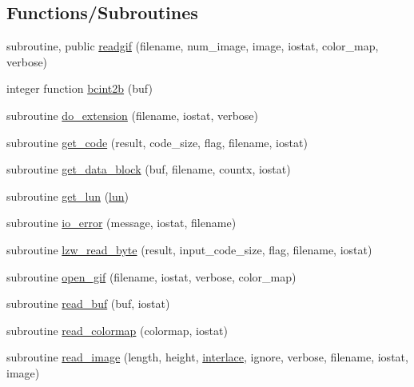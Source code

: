 \subsection*{Functions/\+Subroutines}
\begin{DoxyCompactItemize}
\item 
subroutine, public \mbox{\hyperlink{namespacem__readgif_a775e2da2a9f54ec308e87a339a393ed6}{readgif}} (filename, num\+\_\+image, image, iostat, color\+\_\+map, verbose)
\item 
integer function \mbox{\hyperlink{namespacem__readgif_a38594ce718f97f844771250edcd5e496}{bcint2b}} (buf)
\item 
subroutine \mbox{\hyperlink{namespacem__readgif_a93c5f69ee5054ba2c10ed17b8ab53f6b}{do\+\_\+extension}} (filename, iostat, verbose)
\item 
subroutine \mbox{\hyperlink{namespacem__readgif_a027fedbf7ba68763483988c1aa6d2cea}{get\+\_\+code}} (result, code\+\_\+size, flag, filename, iostat)
\item 
subroutine \mbox{\hyperlink{namespacem__readgif_ace6e51d0293107696bd1482348414a43}{get\+\_\+data\+\_\+block}} (buf, filename, countx, iostat)
\item 
subroutine \mbox{\hyperlink{namespacem__readgif_a7109d632cddcb8d66729d25bbed5c33c}{get\+\_\+lun}} (\mbox{\hyperlink{namespacem__readgif_ae5e05cba63ef3a16c27f9935d6c2a24d}{lun}})
\item 
subroutine \mbox{\hyperlink{namespacem__readgif_ae01d3edbe9e15bf4dd33070581e26fee}{io\+\_\+error}} (message, iostat, filename)
\item 
subroutine \mbox{\hyperlink{namespacem__readgif_a314e657d0662360266bac5702a657ef1}{lzw\+\_\+read\+\_\+byte}} (result, input\+\_\+code\+\_\+size, flag, filename, iostat)
\item 
subroutine \mbox{\hyperlink{namespacem__readgif_ae008e851af60f4d8fdeeb4fd96b8580d}{open\+\_\+gif}} (filename, iostat, verbose, color\+\_\+map)
\item 
subroutine \mbox{\hyperlink{namespacem__readgif_a272a4dbcc1419d3d103db4c50b757805}{read\+\_\+buf}} (buf, iostat)
\item 
subroutine \mbox{\hyperlink{namespacem__readgif_aabaf13dcb1e665b2524049e5661ca4b6}{read\+\_\+colormap}} (colormap, iostat)
\item 
subroutine \mbox{\hyperlink{namespacem__readgif_a4af978d944dbefb3ddeb81cd8c54d0f9}{read\+\_\+image}} (length, height, \mbox{\hyperlink{namespacem__readgif_af71b0131b0327843ab00d56288f1e4a3}{interlace}}, ignore, verbose, filename, iostat, image)
\end{DoxyCompactItemize}
